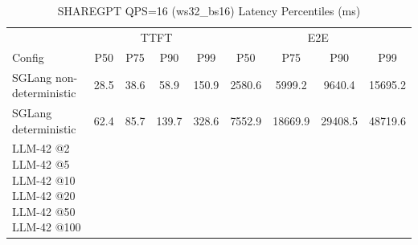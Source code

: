 \begin{table}[htbp]
\centering
\caption{SHAREGPT QPS=16 (ws32_bs16) Latency Percentiles (ms)}
\label{tab:sharegpt_qps16_ws32_bs16}
\begin{tabular}{l|cccc|cccc}
\toprule
& \multicolumn{4}{c|}{TTFT} & \multicolumn{4}{c}{E2E} \\
Config & P50 & P75 & P90 & P99 & P50 & P75 & P90 & P99 \\
\midrule
SGLang non-deterministic & 28.5 & 38.6 & 58.9 & 150.9 & 2580.6 & 5999.2 & 9640.4 & 15695.2 \\
SGLang deterministic & 62.4 & 85.7 & 139.7 & 328.6 & 7552.9 & 18669.9 & 29408.5 & 48719.6 \\
LLM-42 @2%
LLM-42 @5%
LLM-42 @10%
LLM-42 @20%
LLM-42 @50%
LLM-42 @100%
\bottomrule
\end{tabular}
\end{table}
